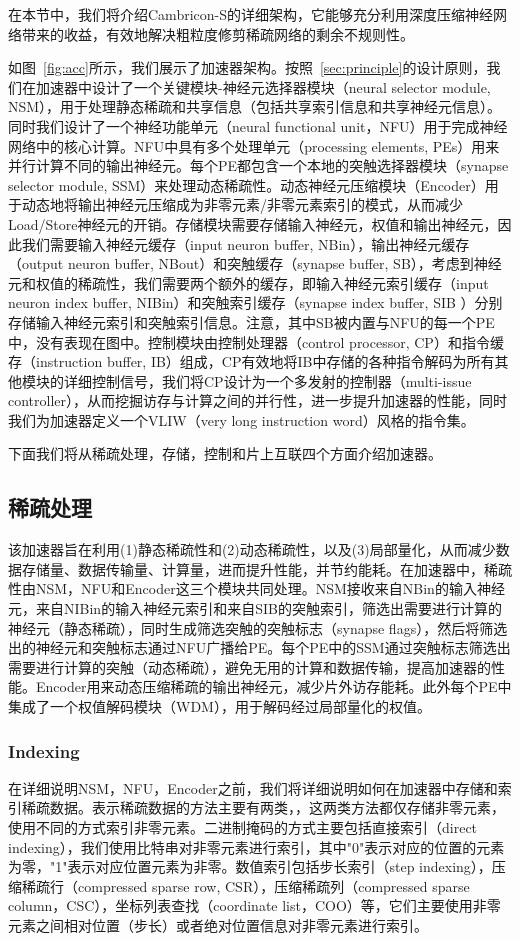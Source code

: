 在本节中，我们将介绍Cambricon-S的详细架构，它能够充分利用深度压缩神经网络带来的收益，有效地解决粗粒度修剪稀疏网络的剩余不规则性。

如图~\ref{fig:acc}所示，我们展示了加速器架构。按照~\ref{sec:principle}的设计原则，我们在加速器中设计了一个关键模块-神经元选择器模块（neural selector module, NSM），用于处理静态稀疏和共享信息（包括共享索引信息和共享神经元信息）。同时我们设计了一个神经功能单元（neural functional unit，NFU）用于完成神经网络中的核心计算。NFU中具有多个处理单元（processing elements, PEs）用来并行计算不同的输出神经元。每个PE都包含一个本地的突触选择器模块（synapse selector module, SSM）来处理动态稀疏性。动态神经元压缩模块（Encoder）用于动态地将输出神经元压缩成为非零元素/非零元素索引的模式，从而减少Load/Store神经元的开销。存储模块需要存储输入神经元，权值和输出神经元，因此我们需要输入神经元缓存（input neuron buffer, NBin），输出神经元缓存（output neuron buffer, NBout）和突触缓存（synapse buffer, SB），考虑到神经元和权值的稀疏性，我们需要两个额外的缓存，即输入神经元索引缓存（input neuron index buffer, NIBin）和突触索引缓存（synapse index buffer, SIB ）分别存储输入神经元索引和突触索引信息。注意，其中SB被内置与NFU的每一个PE中，没有表现在图中。控制模块由控制处理器（control processor, CP）和指令缓存（instruction buffer, IB）组成，CP有效地将IB中存储的各种指令解码为所有其他模块的详细控制信号，我们将CP设计为一个多发射的控制器（multi-issue controller），从而挖掘访存与计算之间的并行性，进一步提升加速器的性能，同时我们为加速器定义一个VLIW（very long instruction word）风格的指令集。

下面我们将从稀疏处理，存储，控制和片上互联四个方面介绍加速器。

\subsection{稀疏处理}
该加速器旨在利用(1)静态稀疏性和(2)动态稀疏性，以及(3)局部量化，从而减少数据存储量、数据传输量、计算量，进而提升性能，并节约能耗。在加速器中，稀疏性由NSM，NFU和Encoder这三个模块共同处理。NSM接收来自NBin的输入神经元，来自NIBin的输入神经元索引和来自SIB的突触索引，筛选出需要进行计算的神经元（静态稀疏），同时生成筛选突触的突触标志（synapse flags），然后将筛选出的神经元和突触标志通过NFU广播给PE。每个PE中的SSM通过突触标志筛选出需要进行计算的突触（动态稀疏），避免无用的计算和数据传输，提高加速器的性能。Encoder用来动态压缩稀疏的输出神经元，减少片外访存能耗。此外每个PE中集成了一个权值解码模块（WDM），用于解码经过局部量化的权值。

\subsubsection{Indexing}
在详细说明NSM，NFU，Encoder之前，我们将详细说明如何在加速器中存储和索引稀疏数据。表示稀疏数据的方法主要有两类，，这两类方法都仅存储非零元素，使用不同的方式索引非零元素。二进制掩码的方式主要包括直接索引（direct indexing），我们使用比特串对非零元素进行索引，其中"0"表示对应的位置的元素为零，"1"表示对应位置元素为非零。数值索引包括步长索引（step indexing），压缩稀疏行（compressed sparse row, CSR），压缩稀疏列（compressed sparse column，CSC），坐标列表查找（coordinate list，COO）等，它们主要使用非零元素之间相对位置（步长）或者绝对位置信息对非零元素进行索引。

